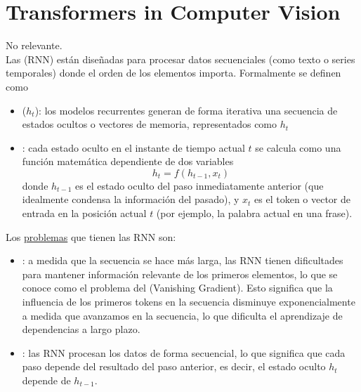\chapter{Transformers in Computer Vision}

\noindent
No relevante.\\

\noindent
Las  (RNN) están diseñadas para procesar datos secuenciales (como texto o series temporales) donde el orden de los elementos importa. Formalmente se definen como 
\begin{itemize}
    \item {} ($h_t$): los modelos recurrentes generan de forma iterativa una secuencia de estados ocultos o vectores de memoria, representados como $h_t$
    \item {}: cada estado oculto en el instante de tiempo actual $t$ se calcula como una función matemática dependiente de dos variables
    $$h_t = f(h_{t-1}, x_t)$$
    donde $h_{t-1}$ es el estado oculto del paso inmediatamente anterior (que idealmente condensa la información del pasado), y $x_t$ es el token o vector de entrada en la posición actual $t$ (por ejemplo, la palabra actual en una frase).
\end{itemize}

Los \underline{problemas} que tienen las RNN son:
\begin{itemize}
    \item {}: a medida que la secuencia se hace más larga, las RNN tienen dificultades para mantener información relevante de los primeros elementos, lo que se conoce como el problema del  (Vanishing Gradient). Esto significa que la influencia de los primeros tokens en la secuencia disminuye exponencialmente a medida que avanzamos en la secuencia, lo que dificulta el aprendizaje de dependencias a largo plazo.
    \item {}: las RNN procesan los datos de forma secuencial, lo que significa que cada paso depende del resultado del paso anterior, es decir, el estado oculto $h_t$ depende de $h_{t-1}$.
\end{itemize}

